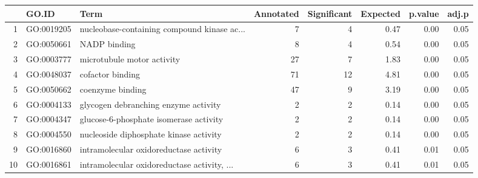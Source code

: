 \begin{table}[ht]
\centering
\begin{tabular}{rllrrrrr}
  \hline
 & GO.ID & Term & Annotated & Significant & Expected & p.value & adj.p \\ 
  \hline
1 & GO:0019205 & nucleobase-containing compound kinase ac... &   7 &   4 & 0.47 & 0.00 & 0.05 \\ 
  2 & GO:0050661 & NADP binding &   8 &   4 & 0.54 & 0.00 & 0.05 \\ 
  3 & GO:0003777 & microtubule motor activity &  27 &   7 & 1.83 & 0.00 & 0.05 \\ 
  4 & GO:0048037 & cofactor binding &  71 &  12 & 4.81 & 0.00 & 0.05 \\ 
  5 & GO:0050662 & coenzyme binding &  47 &   9 & 3.19 & 0.00 & 0.05 \\ 
  6 & GO:0004133 & glycogen debranching enzyme activity &   2 &   2 & 0.14 & 0.00 & 0.05 \\ 
  7 & GO:0004347 & glucose-6-phosphate isomerase activity &   2 &   2 & 0.14 & 0.00 & 0.05 \\ 
  8 & GO:0004550 & nucleoside diphosphate kinase activity &   2 &   2 & 0.14 & 0.00 & 0.05 \\ 
  9 & GO:0016860 & intramolecular oxidoreductase activity &   6 &   3 & 0.41 & 0.01 & 0.05 \\ 
  10 & GO:0016861 & intramolecular oxidoreductase activity, ... &   6 &   3 & 0.41 & 0.01 & 0.05 \\ 
   \hline
\end{tabular}
\end{table}
